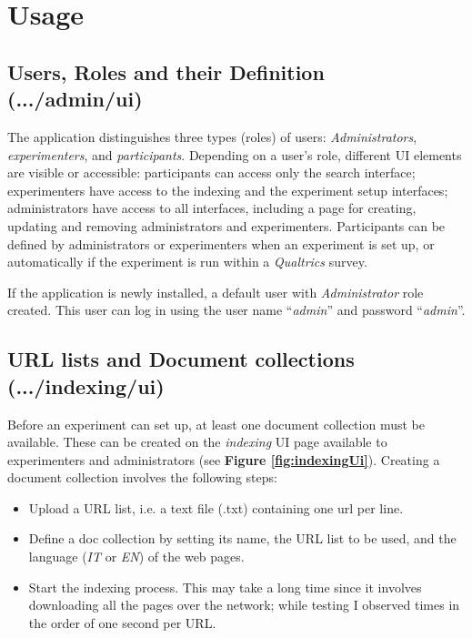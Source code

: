 \documentclass[fleqn]{article}
\begin{document}
\section{Usage}
\label{sec:usage}


\subsection{Users, Roles and their Definition \small{(.../admin/ui)}}

The application distinguishes three types (roles) of users: \emph{Administrators}, \emph{experimenters}, and \emph{participants}.
Depending on a user's role, different UI elements are visible or accessible: participants can access only the search interface; 
experimenters have access to the indexing and the experiment setup interfaces; administrators have access to all interfaces,
including a page for creating, updating and removing administrators and experimenters. Participants can be defined
by administrators or experimenters when an experiment is set up, or automatically if the experiment is run within
a \emph{Qualtrics} survey.

If the application is newly installed, a default user with \emph{Administrator} role created. This user can log in using
the user name ``\emph{admin}'' and password ``\emph{admin}''.

\subsection{URL lists and Document collections \small{(.../indexing/ui)}}

Before an experiment can set up, at least one document collection must be available. These can be created on the \emph{indexing}
UI page available to experimenters and administrators (see \textbf{Figure \ref{fig:indexingUi}}). Creating a document collection involves
the following steps:
\begin{itemize}

\item Upload a URL list, i.e. a text file (.txt) containing one url per line.

\item Define a doc collection by setting its name, the URL list to be used, and the language (\emph{IT} or \emph{EN})
        of the web pages.

\item Start the indexing process. This may take a long time since it involves downloading all the pages over the network;
      while testing I observed times in the order of one second per URL.

\end{itemize}
\end{document}
